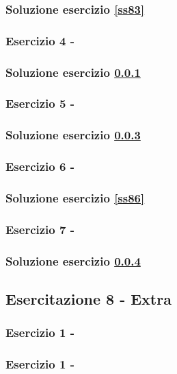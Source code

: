 \documentclass[../main.tex]{subfiles}
\begin{document}
\subsubsection*{Soluzione esercizio \ref{ss83}}

\vspace*{1.5cm}
\subsubsection{Esercizio 4 - }
\label{ss84}

\subsubsection*{Soluzione esercizio \ref{ss84}}

\vspace*{1.5cm}
\subsubsection{Esercizio 5 - }
\label{ss85}

\subsubsection*{Soluzione esercizio \ref{ss85}}

\vspace*{1.5cm}
\subsubsection{Esercizio 6 - }
\label{ss85}

\subsubsection*{Soluzione esercizio \ref{ss86}}


\vspace*{1.5cm}
\subsubsection{Esercizio 7 - }
\label{ss87}

\subsubsection*{Soluzione esercizio \ref{ss87}}



\subsection{Esercitazione 8 - Extra}

\subsubsection{Esercizio 1 - }

\subsubsection{Esercizio 1 - }
\end{document}
